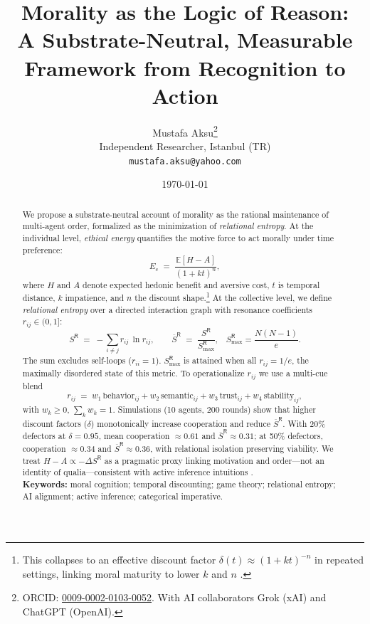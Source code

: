 \documentclass[11pt]{article}
\title{\Large\bfseries Morality as the Logic of Reason:\\
A Substrate-Neutral, Measurable Framework from Recognition to Action}
\author{Mustafa Aksu\thanks{ORCID: \href{https://orcid.org/0009-0002-0103-0052}{0009-0002-0103-0052}. With AI collaborators Grok (xAI) and ChatGPT (OpenAI).}\\
\small Independent Researcher, Istanbul (TR)\\
\small \texttt{mustafa.aksu@yahoo.com}}
\date{\small\today}
\newcommand{\SR}{S^{\mathsf{R}}}
\newcommand{\SRbar}{\overline{S}^{\mathsf{R}}}
\begin{document}
\maketitle

\begin{abstract}
We propose a substrate-neutral account of morality as the rational maintenance of multi-agent order, formalized as the minimization of \emph{relational entropy}. At the individual level, \emph{ethical energy} quantifies the motive force to act morally under time preference:
\begin{equation}
\label{eq:Ec}
E_c \;=\; \frac{\mathbb{E}[H-A]}{(1 + k t)^{n}},
\end{equation}
where $H$ and $A$ denote expected hedonic benefit and aversive cost, $t$ is temporal distance, $k$ impatience, and $n$ the discount shape.\footnote{This collapses to an effective discount factor $\delta(t)\approx(1+kt)^{-n}$ in repeated settings, linking moral maturity to lower $k$ and $n$ \citep{Ainslie1975,Frederick2002}.} At the collective level, we define \emph{relational entropy} over a directed interaction graph with resonance coefficients $r_{ij}\in(0,1]$:
\begin{equation}
\label{eq:SR}
\SR \;=\; -\sum_{i\neq j} r_{ij}\,\ln r_{ij},\qquad
\SRbar \;=\; \frac{\SR}{\SR_{\max}},\;\;\; \SR_{\max}=\frac{N(N-1)}{e}.
\end{equation}
The sum excludes self-loops ($r_{ii}=1$). $\SR_{\max}$ is attained when all $r_{ij}=1/e$, the maximally disordered state of this metric. To operationalize $r_{ij}$ we use a multi-cue blend
\begin{equation}
\label{eq:rij}
r_{ij} \;=\; w_1\,\text{behavior}_{ij}+w_2\,\text{semantic}_{ij}+w_3\,\text{trust}_{ij}+w_4\,\text{stability}_{ij},
\end{equation}
with $w_k\!\ge\!0$, $\sum_k w_k\!=\!1$. Simulations (10 agents, 200 rounds) show that higher discount factors ($\delta$) monotonically increase cooperation and reduce $\SRbar$. With 20\% defectors at $\delta=0.95$, mean cooperation $\approx 0.61$ and $\SRbar\!\approx\!0.31$; at 50\% defectors, cooperation $\approx 0.34$ and $\SRbar\!\approx\!0.36$, with relational isolation preserving viability. We treat $H\!-\!A \propto -\Delta \SR$ as a pragmatic proxy linking motivation and order---not an identity of qualia---consistent with active inference intuitions \citep{Friston2010}.\\[4pt]
\noindent\textbf{Keywords:} moral cognition; temporal discounting; game theory; relational entropy; AI alignment; active inference; categorical imperative.
\end{abstract}
\end{document}
